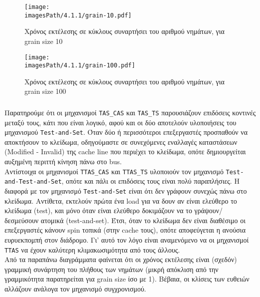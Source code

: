 \documentclass[12pt,a4paper]{article}
\newcommand{\imagesPath}{/home/nick/arch-ntua/ex03/graphs}
\newcommand{\myWidth}{0.8\linewidth}
\begin{document}
				\begin{figure}[H]
					\begin{center}
						\texttt{[image: \\imagesPath/4.1.1/grain-10.pdf]}
						\caption{Χρόνος εκτέλεσης σε κύκλους συναρτήσει του αριθμού νημάτων, για grain size 10}
					\end{center}
				\end{figure}
			
				\begin{figure}[H]
					\begin{center}
						\texttt{[image: \\imagesPath/4.1.1/grain-100.pdf]}
						\caption{Χρόνος εκτέλεσης σε κύκλους συναρτήσει του αριθμού νημάτων, για grain size 100}
					\end{center}
				\end{figure}
				
			\subsubsection{}

				Παρατηρούμε ότι οι μηχανισμοί \verb|TAS_CAS| και \verb|TAS_TS| παρουσιάζουν επιδόσεις κοντινές μεταξύ τους, κάτι που είναι λογικό, αφού και οι δύο αποτελούν υλοποιήσεις του μηχανισμού \verb|Test-and-Set|. Όταν δύο ή περισσότεροι επεξεργαστές προσπαθούν να αποκτήσουν το κλείδωμα, οδηγούμαστε σε συνεχόμενες εναλλαγές καταστάσεων (Modified - Invalid) της cache line που περιέχει το κλείδωμα, οπότε δημιουργείται αυξημένη περιττή κίνηση πάνω στο bus. \\
				
				Αντίστοιχα οι μηχανισμοί \verb|TTAS_CAS| και \verb|TTAS_TS| υλοποιούν τον μηχανισμό \verb|Test-and-Test-and-Set|, οπότε και πάλι οι επιδόσεις τους είναι πολύ παραπλήσιες. Η διαφορά με τον μηχανισμό \verb|Test-and-Set| είναι ότι δεν γράφουν συνεχώς πάνω στο κλείδωμα. Αντίθετα, εκτελούν πρώτα ένα load για να δουν αν είναι ελεύθερο το κλείδωμα (test), και μόνο όταν είναι ελεύθερο δοκιμάζουν να το γράψουν/δεσμεύσουν ατομικά (test-and-set). Έτσι, όταν το κλείδωμα δεν είναι διαθέσιμο οι επεξεργαστές κάνουν spin τοπικά (στην cache τους), οπότε αποφεύγεται η ανούσια ευρυεκπομπή στον διάδρομο. Γι' αυτό τον λόγο είναι αναμενόμενο να οι μηχανισμοί \verb|TTAS| να έχουν καλύτερη κλιμακωσιμότητα από τους άλλους. \\
				
				Από τα παραπάνω διαγράμματα φαίνεται ότι οι χρόνος εκτέλεσης είναι (σχεδόν) γραμμική συνάρτηση του πλήθους των νημάτων (μικρή απόκλιση από την γραμμικότητα παρατηρείται για grain size ίσο με 1). Βέβαια, οι κλίσεις των ευθειών αλλάζουν ανάλογα τον μηχανισμό συγχρονισμού. \\
				
\end{document}
